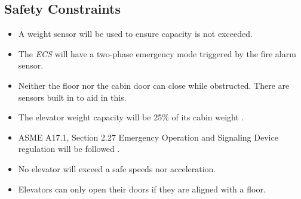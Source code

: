 \documentclass[12pt]{article}
\begin{document}
\subsection{Safety Constraints}
\begin{itemize}
	\item A weight sensor will be used to ensure capacity is not exceeded.
	\item The \textit{ECS} will have a two-phase emergency mode triggered by the fire alarm sensor.
	\item Neither the floor nor the cabin door can close while obstructed. There are sensors built in to aid in this.
	\item The elevator weight capacity will be 25\% of its cabin weight \citep{krupp}.
	\item ASME A17.1, Section 2.27 Emergency Operation and Signaling Device regulation will be followed \citep{asme}.
	\item No elevator will exceed a safe speeds nor acceleration.
	\item Elevators can only open their doors if they are aligned with a floor.
\end{itemize}

\end{document}
